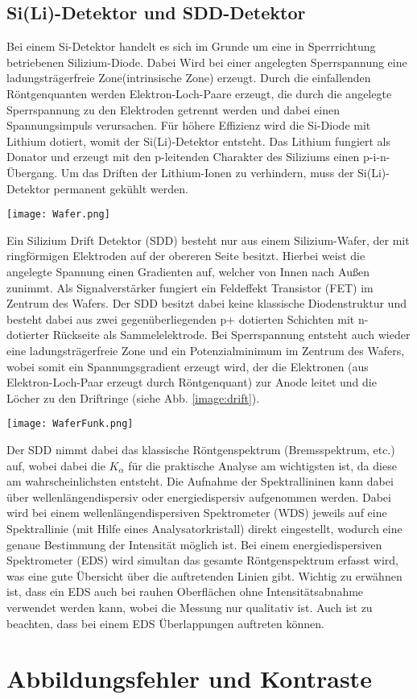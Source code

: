 \subsection*{Si(Li)-Detektor und SDD-Detektor}
\label{sub:siliDetect}
Bei einem Si-Detektor handelt es sich im Grunde um eine in Sperrrichtung betriebenen Silizium-Diode. Dabei Wird bei einer angelegten Sperrspannung eine ladungsträgerfreie Zone(intrinsische Zone) erzeugt. Durch die einfallenden Röntgenquanten werden Elektron-Loch-Paare erzeugt, die durch die angelegte Sperrspannung zu den Elektroden getrennt werden und dabei einen Spannungsimpuls verursachen. Für höhere Effizienz wird die Si-Diode mit Lithium dotiert, womit der Si(Li)-Detektor entsteht. Das Lithium fungiert als Donator und erzeugt mit den p-leitenden Charakter des Siliziums einen p-i-n-Übergang. Um das Driften der Lithium-Ionen zu verhindern, muss der Si(Li)-Detektor permanent gekühlt werden. \citep{RasterEM}
\begin{center}
    \texttt{[image: Wafer.png]}
    \label{image:sddDetect}
\end{center}
Ein Silizium Drift Detektor (SDD) besteht nur aus einem Silizium-Wafer, der mit ringförmigen Elektroden auf der obereren Seite besitzt. Hierbei weist die angelegte Spannung einen Gradienten auf, welcher von Innen nach Außen zunimmt. Als Signalverstärker fungiert ein Feldeffekt Transistor (FET) im Zentrum des Wafers. Der SDD besitzt dabei keine klassische Diodenstruktur und besteht dabei aus zwei gegenüberliegenden p+ dotierten Schichten mit n- dotierter Rückseite als Sammelelektrode. Bei Sperrspannung entsteht auch wieder eine ladungsträgerfreie Zone und ein Potenzialminimum im Zentrum des Wafers, wobei somit ein Spannungsgradient erzeugt wird, der die Elektronen (aus Elektron-Loch-Paar erzeugt durch Röntgenquant) zur Anode leitet und die Löcher zu den Driftringe (siehe Abb. \ref{image:drift}).
\begin{center}
    \texttt{[image: WaferFunk.png]}
    \label{image:drift}
\end{center}
Der SDD nimmt dabei das klassische Röntgenspektrum (Bremsspektrum, etc.) auf, wobei dabei die $K_\alpha$ für die praktische Analyse am wichtigsten ist, da diese am wahrscheinlichsten entsteht. Die Aufnahme der Spektrallininen kann dabei über wellenlängendispersiv oder energiedispersiv aufgenommen werden. Dabei wird bei einem wellenlängendispersiven Spektrometer (WDS) jeweils auf eine Spektrallinie (mit Hilfe eines Analysatorkristall) direkt eingestellt, wodurch eine genaue Bestimmung der Intensität möglich ist. Bei einem energiedispersiven Spektrometer (EDS) wird simultan das gesamte Röntgenspektrum erfasst wird, was eine gute Übersicht über die auftretenden Linien gibt. Wichtig zu erwähnen ist, dass ein EDS auch bei rauhen Oberflächen ohne Intensitätsabnahme verwendet werden kann, wobei die Messung nur qualitativ ist. Auch ist zu beachten, dass bei einem EDS Überlappungen auftreten können. \citep{RasterEM}

\section{Abbildungsfehler und Kontraste}
\label{sec:imageErrorKontrast}